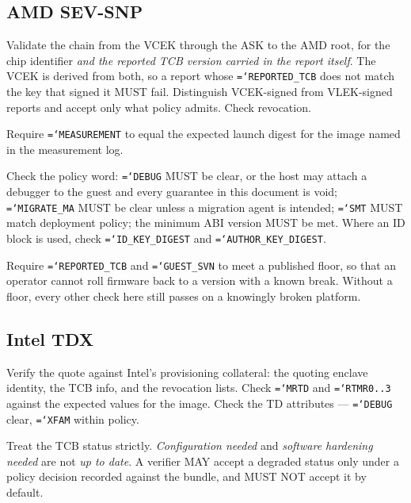 \documentclass[11pt,a4paper]{article}
\newcommand{\code}[1]{\texttt{\hyphenchar\font=`\-\relax #1}}
\newcommand{\req}[1]{\textbf{#1}}
\begin{document}
\subsection{AMD SEV-SNP}

\begin{description}[leftmargin=1.6em]
\item[\req{V6}] Validate the chain from the VCEK through the ASK to the AMD root,
for the chip identifier \emph{and the reported TCB version carried in the report
itself}. The VCEK is derived from both, so a report whose \code{REPORTED\_TCB} does
not match the key that signed it MUST fail. Distinguish VCEK-signed from
VLEK-signed reports and accept only what policy admits. Check revocation.

\item[\req{V7}] Require \code{MEASUREMENT} to equal the expected launch digest for
the image named in the measurement log.

\item[\req{V8}] Check the policy word: \code{DEBUG} MUST be clear, or the host may
attach a debugger to the guest and every guarantee in this document is void;
\code{MIGRATE\_MA} MUST be clear unless a migration agent is intended;
\code{SMT} MUST match deployment policy; the minimum ABI version MUST be met. Where
an ID block is used, check \code{ID\_KEY\_DIGEST} and \code{AUTHOR\_KEY\_DIGEST}.

\item[\req{V9}] Require \code{REPORTED\_TCB} and \code{GUEST\_SVN} to meet a
published floor, so that an operator cannot roll firmware back to a version with a
known break. Without a floor, every other check here still passes on a knowingly
broken platform.
\end{description}

\subsection{Intel TDX}

\begin{description}[leftmargin=1.6em]
\item[\req{V10}] Verify the quote against Intel's provisioning collateral: the
quoting enclave identity, the TCB info, and the revocation lists. Check
\code{MRTD} and \code{RTMR0..3} against the expected values for the image. Check
the TD attributes --- \code{DEBUG} clear, \code{XFAM} within policy.

\item[\req{V11}] Treat the TCB status strictly. \emph{Configuration needed} and
\emph{software hardening needed} are not \emph{up to date}. A verifier MAY accept a
degraded status only under a policy decision recorded against the bundle, and MUST
NOT accept it by default.
\end{description}
\end{document}
